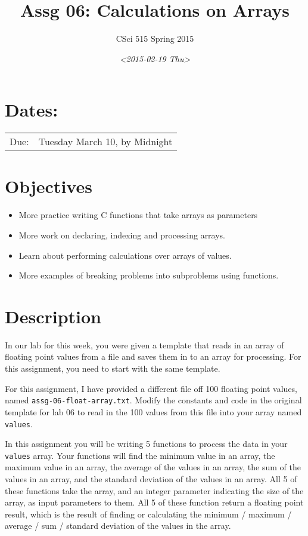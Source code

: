 \documentclass[11pt]{article}
\author{CSci 515 Spring 2015}
\date{\textit{<2015-02-19 Thu>}}
\title{Assg 06: Calculations on Arrays}
\begin{document}
\maketitle

\section*{Dates:}
\label{sec-1}
\begin{center}
\begin{tabular}{ll}
Due: & Tuesday March 10, by Midnight\\
\end{tabular}
\end{center}
\section*{Objectives}
\label{sec-2}
\begin{itemize}
\item More practice writing C functions that take arrays as parameters
\item More work on declaring, indexing and processing arrays.
\item Learn about performing calculations over arrays of values.
\item More examples of breaking problems into subproblems using functions.
\end{itemize}
\section*{Description}
\label{sec-3}
In our lab for this week, you were given a template that reads in an array
of floating point values from a file and saves them in to an array for processing.
For this assignment, you need to start with the same template.

For this assignment, I have provided a different file off 100 floating
point values, named \verb~assg-06-float-array.txt~.  Modify the constants and
code in the original template for lab 06 to read in the 100 values
from this file into your array named \verb~values~.

In this assignment you will be writing 5 functions to process the data
in your \verb~values~ array.  Your functions will find the minimum value in
an array, the maximum value in an array, the average of the values in
an array, the sum of the values in an array, and the standard deviation
of the values in an array.  All 5 of these functions take the array,
and an integer parameter indicating the size of the array, as input
parameters to them.  All 5 of these function return a floating point
result, which is the result of finding or calculating the minimum /
maximum / average / sum / standard deviation of the values in the array.
\end{document}
